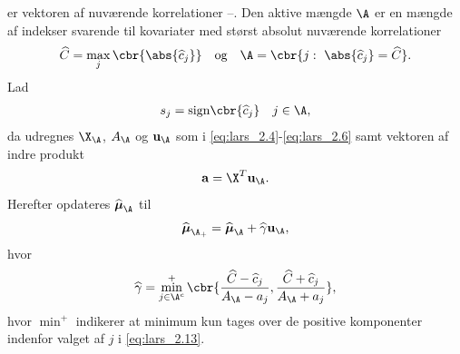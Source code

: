 er vektoren af nuværende korrelationer --.
Den aktive mængde \(\A\) er en mængde af indekser svarende til kovariater med størst absolut nuværende korrelationer
\begin{align*}
\widehat{C} = \max_j \cbr{\abs{\widehat{c}_j}} \quad \text{og} \quad \A= \cbr{j: \ \abs{ \widehat{c}_j} = \widehat{C}}.
\end{align*}
Lad 
\begin{align*}
s_j = \text{sign} \cbr{\widehat{c}_j} \quad j \in \A,
\end{align*}
da udregnes \(\X_\A\), \(A_\A\) og \(\mathbf{u}_\A\) som i \eqref{eq:lars_2.4}-\eqref{eq:lars_2.6}  samt vektoren af indre produkt
\begin{align*}
\mathbf{a} = \X^T \mathbf{u}_\A.
\end{align*}
Herefter opdateres \(\widehat{\boldsymbol{\mu}}_\A\) til
\begin{align*}
\widehat{\boldsymbol{\mu}}_{\A_+} = \widehat{\boldsymbol{\mu}}_\A + \widehat{\gamma} \mathbf{u}_\A,
\end{align*}
hvor 
\begin{align}
\widehat{\gamma} = \min_{j \in \A^c}^+ \cbr{ \frac{\widehat{C}- \widehat{c}_j}{A_\A - a_j} , \frac{\widehat{C} + \widehat{c}_j}{A_\A + a_j}}, \label{eq:lars_2.13}
\end{align}
hvor \(\min^+\) indikerer at minimum kun tages over de positive komponenter indenfor valget af \(j\) i \eqref{eq:lars_2.13}.


